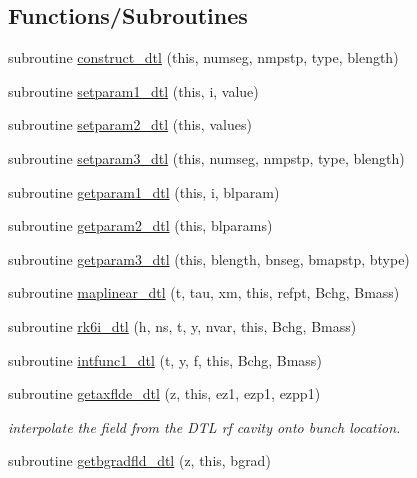 \subsection*{Functions/\+Subroutines}
\begin{DoxyCompactItemize}
\item 
subroutine \mbox{\hyperlink{namespacedtlclass_a5f65e89a18b2765e966ea8c1db85aa0c}{construct\+\_\+dtl}} (this, numseg, nmpstp, type, blength)
\item 
subroutine \mbox{\hyperlink{namespacedtlclass_aa8af784d85ac535b6238e9dd4d844be9}{setparam1\+\_\+dtl}} (this, i, value)
\item 
subroutine \mbox{\hyperlink{namespacedtlclass_a267abecac3bfad96fd1ce717ba50c8b4}{setparam2\+\_\+dtl}} (this, values)
\item 
subroutine \mbox{\hyperlink{namespacedtlclass_aaccb0362c1862fd4f4e34a23f1bb25b9}{setparam3\+\_\+dtl}} (this, numseg, nmpstp, type, blength)
\item 
subroutine \mbox{\hyperlink{namespacedtlclass_abd0fd1a590b8e198a5b7081e105f11e8}{getparam1\+\_\+dtl}} (this, i, blparam)
\item 
subroutine \mbox{\hyperlink{namespacedtlclass_aac10b9bb174a986cd15c1f0a11369c57}{getparam2\+\_\+dtl}} (this, blparams)
\item 
subroutine \mbox{\hyperlink{namespacedtlclass_adb7337b9d81c5d4fef24ba72ad107cbe}{getparam3\+\_\+dtl}} (this, blength, bnseg, bmapstp, btype)
\item 
subroutine \mbox{\hyperlink{namespacedtlclass_afcf262e9f63f2008931d898ff6d9973a}{maplinear\+\_\+dtl}} (t, tau, xm, this, refpt, Bchg, Bmass)
\item 
subroutine \mbox{\hyperlink{namespacedtlclass_aa1988f1526102adea7683c31ce2164d9}{rk6i\+\_\+dtl}} (h, ns, t, y, nvar, this, Bchg, Bmass)
\item 
subroutine \mbox{\hyperlink{namespacedtlclass_a913997c12a39f072f1a2be1576dc59d2}{intfunc1\+\_\+dtl}} (t, y, f, this, Bchg, Bmass)
\item 
subroutine \mbox{\hyperlink{namespacedtlclass_a1fb756446dfd217cc32e4a9088e7f4c7}{getaxflde\+\_\+dtl}} (z, this, ez1, ezp1, ezpp1)
\begin{DoxyCompactList}\small\item\em interpolate the field from the D\+TL rf cavity onto bunch location. \end{DoxyCompactList}\item 
subroutine \mbox{\hyperlink{namespacedtlclass_a79f0618eb609338c97470f6f8f05a848}{getbgradfld\+\_\+dtl}} (z, this, bgrad)

\end{DoxyCompactItemize}
